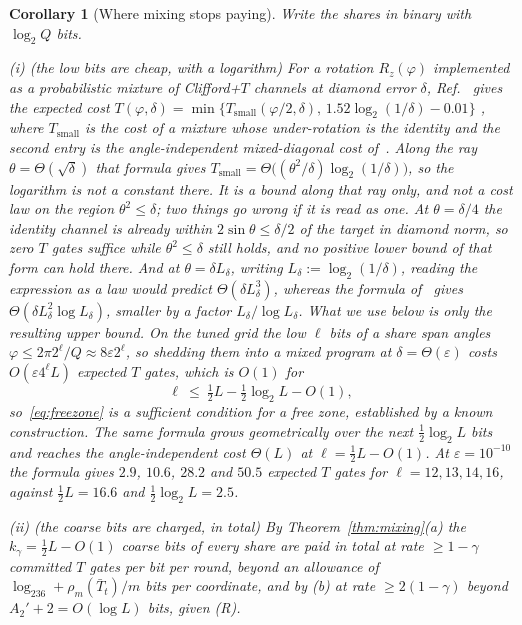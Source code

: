 \documentclass[aps,prx,twocolumn,superscriptaddress,nofootinbib,longbibliography]{revtex4-2}
\theoremstyle{plain}
\newtheorem{corollary}{Corollary}
\theoremstyle{definition}
\theoremstyle{remark}
\begin{document}
\begin{corollary}[Where mixing stops paying]\label{cor:mixstop}
Write the shares in binary with $\log_2Q$ bits.

(i) \emph{(the low bits are cheap, with a logarithm)} For a rotation $R_z(\varphi)$ implemented as a probabilistic mixture of Clifford+$T$ channels at diamond error $\delta$, Ref.~\cite{Bothe} gives the expected cost $T(\varphi,\delta)=\min\{T_{\mathrm{small}}(\varphi/2,\delta),\,1.52\log_2(1/\delta)-0.01\}$ \cite[Eqs.~(9)--(12), in the convention $R_Z(\theta)=e^{i\theta Z}$]{Bothe}, where $T_{\mathrm{small}}$ is the cost of a mixture whose under-rotation is the identity and the second entry is the angle-independent mixed-diagonal cost of~\cite{KLMPP}. Along the ray $\theta=\Theta(\sqrt\delta)$ that formula gives $T_{\mathrm{small}}=\Theta\big((\theta^2/\delta)\log_2(1/\delta)\big)$, so the logarithm is not a constant there. It is a bound along that ray only, and not a cost law on the region $\theta^2\le\delta$; two things go wrong if it is read as one. At $\theta=\delta/4$ the identity channel is already within $2\sin\theta\le\delta/2$ of the target in diamond norm, so zero $T$ gates suffice while $\theta^2\le\delta$ still holds, and no positive lower bound of that form can hold there. And at $\theta=\delta L_\delta$, writing $L_\delta:=\log_2(1/\delta)$, reading the expression as a law would predict $\Theta(\delta L_\delta^3)$, whereas the formula of~\cite{Bothe} gives $\Theta(\delta L_\delta^2\log L_\delta)$, smaller by a factor $L_\delta/\log L_\delta$. What we use below is only the resulting \emph{upper} bound. On the tuned grid the low $\ell$ bits of a share span angles $\varphi\le2\pi2^\ell/Q\approx8\varepsilon2^\ell$, so shedding them into a mixed program at $\delta=\Theta(\varepsilon)$ costs $O(\varepsilon4^\ell L)$ expected $T$ gates, which is $O(1)$ for
\begin{equation}\label{eq:freezone}
\ell\ \le\ \tfrac12L-\tfrac12\log_2L-O(1),
\end{equation}
so~\eqref{eq:freezone} is a sufficient condition for a free zone, established by a known construction. The same formula grows geometrically over the next $\tfrac12\log_2L$ bits and reaches the angle-independent cost $\Theta(L)$ at $\ell=\tfrac12L-O(1)$. At $\varepsilon=10^{-10}$ the formula gives $2.9$, $10.6$, $28.2$ and $50.5$ expected $T$ gates for $\ell=12,13,14,16$, against $\tfrac12L=16.6$ and $\tfrac12\log_2L=2.5$.

(ii) \emph{(the coarse bits are charged, in total)} By Theorem~\ref{thm:mixing}(a) the $k_\gamma=\tfrac12L-O(1)$ coarse bits of every share are paid \emph{in total} at rate $\ge1-\gamma$ committed $T$ gates per bit per round, beyond an allowance of $\log_236+\rho_m(\bar T_t)/m$ bits per coordinate, and by (b) at rate $\ge2(1-\gamma)$ beyond $A_2'+2=O(\log L)$ bits, given (R).
\end{corollary}
\end{document}
